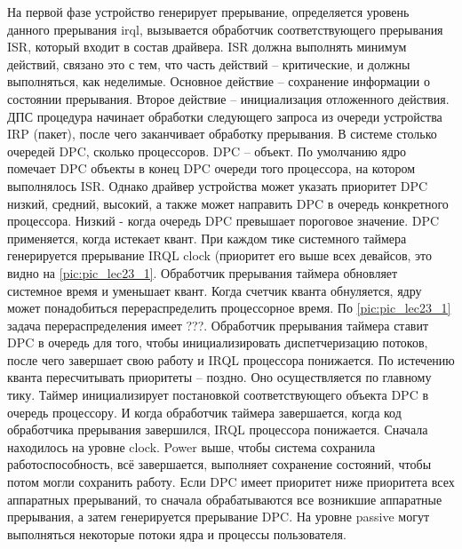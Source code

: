 На первой фазе  устройство генерирует прерывание, определяется уровень данного прерывания irql, вызывается обработчик соответствующего прерывания ISR, который входит в состав драйвера. ISR должна выполнять минимум действий, связано это с тем, что часть действий – критические, и должны выполняться, как неделимые.  Основное действие – сохранение информации о состоянии прерывания. Второе действие – инициализация отложенного действия.
ДПС процедура начинает обработки следующего запроса из очереди устройства IRP (пакет), после чего заканчивает обработку прерывания. В системе столько очередей DPC, сколько процессоров. DPC – объект. По умолчанию ядро помечает DPC объекты в конец DPC очереди того процессора, на котором выполнялось ISR. Однако драйвер устройства может указать приоритет DPC {низкий, средний, высокий}, а также может направить DPC в очередь конкретного процессора.  Низкий - когда очередь DPC превышает пороговое значение. DPC применяется, когда истекает квант. При каждом тике системного таймера генерируется прерывание IRQL clock (приоритет его выше всех девайсов, это видно на \ref{pic:pic_lec23_1}. Обработчик прерывания таймера обновляет системное время и уменьшает квант. Когда счетчик кванта обнуляется, ядру может понадобиться перераспределить процессорное время. По \ref{pic:pic_lec23_1} задача перераспределения имеет ???. Обработчик прерывания таймера ставит DPC  в очередь для того, чтобы инициализировать диспетчеризацию потоков, после чего завершает свою работу и IRQL процессора понижается. По истечению кванта пересчитывать приоритеты – поздно. Оно осуществляется по главному тику. Таймер инициализирует постановкой соответствующего объекта DPC в очередь процессору. И когда обработчик таймера завершается, когда код обработчика прерывания завершился, IRQL процессора понижается. Сначала находилось на уровне clock. Power выше, чтобы система сохранила работоспособность,  всё завершается, выполняет сохранение состояний, чтобы потом могли сохранить работу. Если DPC имеет приоритет ниже приоритета всех аппаратных прерываний, то сначала обрабатываются все возникшие аппаратные прерывания, а затем генерируется прерывание DPC. На уровне passive могут выполняться некоторые потоки ядра и процессы пользователя.